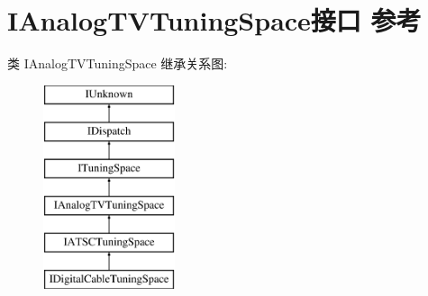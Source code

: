 \hypertarget{interface_i_analog_t_v_tuning_space}{}\section{I\+Analog\+T\+V\+Tuning\+Space接口 参考}
\label{interface_i_analog_t_v_tuning_space}
类 I\+Analog\+T\+V\+Tuning\+Space 继承关系图\+:\begin{figure}[H]
\begin{center}
\leavevmode
\includegraphics[height=6.000000cm]{interface_i_analog_t_v_tuning_space}
\end{center}
\end{figure}
